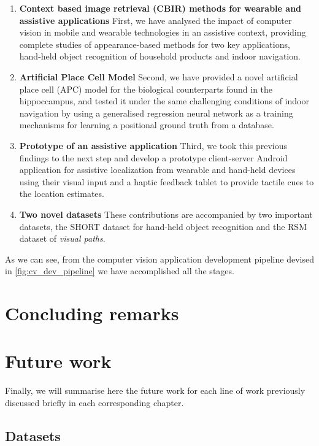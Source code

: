 \begin{enumerate}
\item \textbf{Context based image retrieval (CBIR) methods for wearable and assistive applications} First, we have analysed the impact of computer vision in mobile and wearable technologies in an assistive context, providing complete studies of appearance-based methods for two key applications, hand-held object recognition of household products and indoor navigation.

\item \textbf{Artificial Place Cell Model} Second, we have provided a novel artificial place cell (APC) model for the biological counterparts found in the hippoccampus, and tested it under the same challenging conditions of indoor navigation by using a generalised regression neural network as a training mechanisms for learning a positional ground truth from a database.

\item \textbf{Prototype of an assistive application} Third, we took this previous findings to the next step and develop a prototype client-server Android application for assistive localization from wearable and hand-held devices using their visual input and a haptic feedback tablet to provide tactile cues to the location estimates.

\item \textbf{Two novel datasets} These contributions are accompanied by two important datasets, the SHORT dataset for hand-held object recognition and the RSM dataset of \emph{visual paths}.

\end{enumerate}

As we can see, from the computer vision application development pipeline devised in \ref{fig:cv_dev_pipeline} we have accomplished all the stages.

\section{Concluding remarks}

\section{Future work}

Finally, we will summarise here the future work for each line of work previously discussed briefly in each corresponding chapter.

\subsection{Datasets}

